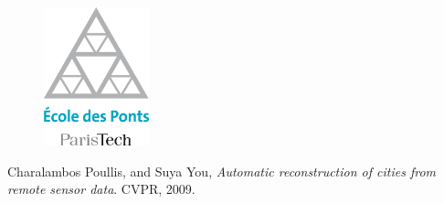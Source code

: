  
 
 


 
 \begin{figure}
  \centering
   \includegraphics[height=4cm]{Illustrations/enpc.png}
  \end{figure}
 \maketitle
 \newpage
 \thispagestyle{plain}
 \tableofcontents
 
 
 
 
 
 
 
 
 
\begin{thebibliography}{9}
          Charalambos Poullis, and Suya You,
          \emph{Automatic reconstruction of cities from remote sensor data}.
          CVPR,
          2009.
\end{thebibliography}
 
 
